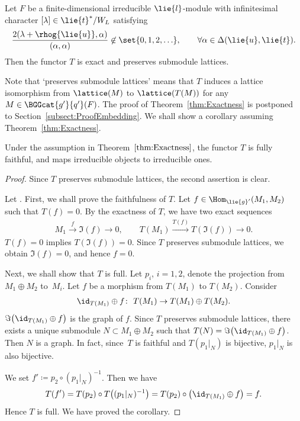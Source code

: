 \begin{Theorem}\label{thm:Exactness}
	Let $F$ be a finite-dimensional irreducible $\lie{l}$-module with infinitesimal character $[\lambda] \in \lie{t}^*/W_L$
	satisfying
	\begin{align*}
		\frac{2(\lambda+\rhog{\lie{u}}, \alpha)}{(\alpha, \alpha)} \not \in \set{0, 1, 2, \ldots}, \qquad \forall \alpha \in \Delta(\lie{u}, \lie{t}).
	\end{align*}
	Then the functor $T$ is exact and preserves submodule lattices.
\end{Theorem}

Note that `preserves submodule lattices' means that $T$ induces a lattice isomorphism from $\lattice(M)$ to $\lattice(T(M))$ for any $M \in \BGGcat{g'}{q'}(F)$.
The proof of Theorem~\ref{thm:Exactness} is postponed to Section~\ref{subsect:ProofEmbedding}.
We shall show a corollary assuming Theorem~\ref{thm:Exactness}.

\begin{Corollary}\label{cor:CategoryEquivalence}
	Under the assumption in Theorem~$\ref{thm:Exactness}$,
	the functor $T$ is fully faithful, and maps irreducible objects to irreducible ones.
\end{Corollary}

\begin{proof}
	Since $T$ preserves submodule lattices, the second assertion is clear.

	Let .
	First, we shall prove the faithfulness of $T$.
	Let $f \in \Hom_{\lie{g}'}(M_1, M_2)$ such that $T(f)=0$.
	By the exactness of $T$, we have two exact sequences
	\begin{align*}
		M_1 \xrightarrow{f} \Im(f) \rightarrow 0, \qquad T(M_1) \xrightarrow{T(f)} T(\Im(f)) \rightarrow 0.
	\end{align*}
	$T(f)=0$ implies $T(\Im(f))=0$.
	Since $T$ preserves submodule lattices, we obtain $\Im(f)=0$, and hence $f=0$.

	Next, we shall show that $T$ is full.
	Let $p_i$, $i = 1, 2$, denote the projection from $M_1 \oplus M_2$ to~$M_i$.
	Let $f$ be a morphism from $T(M_1)$ to $T(M_2)$.
	Consider
	\begin{align*}
		\id_{T(M_1)}\oplus f\colon\ T(M_1) \rightarrow T(M_1) \oplus T(M_2).
	\end{align*}
	$\Im\bigl(\id_{T(M_1)} \oplus f\bigr)$ is the graph of $f$.
	Since $T$ preserves submodule lattices, there exists a unique submodule $N \subset M_1 \oplus M_2$
	such that $T(N)=\Im\bigl(\id_{T(M_1)}\oplus f\bigr)$.
	Then $N$ is a graph.
	In fact, since~$T$ is faithful and $T(p_1|_N)$ is bijective,
	$p_1|_N$ is also bijective.

	We set $f'\coloneq p_2\circ(p_1|_N)^{-1}$.
	Then we have
 \[
 T(f')=T(p_2)\circ T\bigl((p_1|_N)^{-1}\bigr)=T(p_2)\circ \bigl(\id_{T(M_1)}\oplus f\bigr)=f.
 \]
	Hence $T$ is full.
	We have proved the corollary.
\end{proof}

